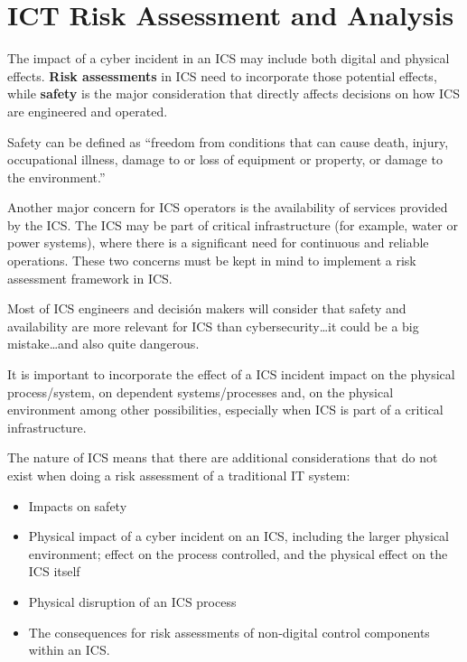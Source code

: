 \section{ICT Risk Assessment and Analysis}
The impact of a cyber incident in an ICS may include both digital and physical effects. \textbf{Risk assessments} in ICS need to incorporate those potential effects, while \textbf{safety} is the major consideration that directly affects decisions on how
ICS are engineered and operated.

\begin{definition}
   [Safety]
Safety can be defined as ``freedom from conditions that can cause death, injury, occupational illness, damage to or loss of equipment or property, or damage to the environment.''
\end{definition}


Another major concern for ICS operators is the availability of services
provided by the ICS.
The ICS may be part of critical infrastructure (for example, water or power
systems), where there is a significant need for continuous and reliable operations.
These two concerns must be kept in mind to implement a risk assessment framework in ICS.

Most of ICS engineers and decisión makers will consider that safety and availability are more relevant for ICS than cybersecurity\dots it could be a big mistake\dots and also quite dangerous.

It is important to incorporate the effect of a ICS incident impact on the physical process/system, on dependent systems/processes and, on the physical environment among other possibilities, especially when ICS is part of a critical infrastructure.

The nature of ICS means that there are additional considerations that do not exist
when doing a risk assessment of a traditional IT system:
\begin{itemize}
	\item Impacts on safety
	\item Physical impact of a cyber incident on an ICS, including the larger physical environment; effect on the process controlled, and the physical effect on the ICS itself
	\item Physical disruption of an ICS process
	\item The consequences for risk assessments of non-digital control components within an ICS.
\end{itemize}


